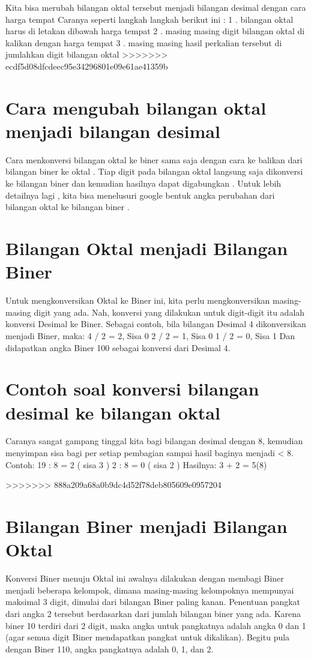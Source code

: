 Kita bisa merubah bilangan oktal tersebut menjadi bilangan desimal dengan cara harga tempat
Caranya seperti langkah langkah berikut ini :
1 . bilangan oktal harus di letakan dibawah harga tempat
2 . masing masing digit bilangan oktal di kalikan dengan harga tempat
3 . masing masing hasil perkalian tersebut di jumlahkan digit bilangan oktal  
>>>>>>> ecdf5d08dfcdeec95e34296801e09e61ae41359b

\section {Cara mengubah bilangan oktal menjadi bilangan desimal}
Cara menkonversi bilangan oktal ke biner sama saja dengan cara ke balikan dari bilangan biner ke oktal . Tiap digit pada bilangan oktal langsung saja dikonversi ke bilangan biner dan kemudian hasilnya dapat digabungkan . Untuk lebih detailnya lagi , kita bisa menelusuri google bentuk angka perubahan dari bilangan oktal ke bilangan biner .

\section {Bilangan Oktal menjadi Bilangan Biner}
Untuk mengkonversikan Oktal ke Biner ini, kita perlu mengkonversikan masing-masing digit yang ada. Nah, konversi yang dilakukan untuk digit-digit itu adalah konversi Desimal ke Biner. Sebagai contoh, bila bilangan Desimal 4 dikonversikan menjadi Biner, maka:
4  / 2 = 2, Sisa 0
2 / 2 = 1, Sisa 0
1 / 2 = 0, Sisa 1
Dan didapatkan angka Biner 100 sebagai konversi dari Desimal 4.

\section {Contoh soal konversi bilangan desimal ke bilangan oktal}
Caranya sangat gampang tinggal kita bagi bilangan desimal dengan 8, 
kemudian menyimpan sisa bagi per setiap pembagian 
sampai hasil baginya menjadi < 8.
Contoh: 19 : 8 = 2 ( sisa 3 )
2 : 8 = 0 ( sisa 2 )
Hasilnya: 3 + 2 = 5(8)


>>>>>>> 888a209a68a0b9dc4d52f78deb805609e0957204
\section {Bilangan Biner menjadi Bilangan Oktal}
Konversi Biner menuju Oktal ini awalnya dilakukan dengan membagi Biner menjadi beberapa kelompok, dimana masing-masing kelompoknya mempunyai maksimal 3 digit, dimulai dari bilangan Biner paling kanan.
Penentuan pangkat dari angka 2 tersebut berdasarkan dari jumlah bilangan biner yang ada. Karena biner 10 terdiri dari 2 digit, maka angka untuk pangkatnya adalah angka 0 dan 1 (agar semua digit Biner mendapatkan pangkat untuk dikalikan). Begitu pula dengan Biner 110, angka pangkatnya adalah 0, 1, dan 2.

